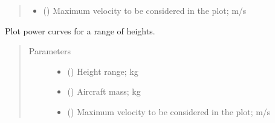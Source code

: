 \documentclass[letterpaper,10pt,english]{sphinxmanual}
\begin{document}
\begin{fulllineitems}
\begin{fulllineitems}
\begin{quote}
\begin{description}
\begin{itemize}
\item {} 
\sphinxAtStartPar
{} (\sphinxstyleliteralemphasis{\sphinxupquote{, }}) \textendash{} Maximum velocity to be considered in the plot; m/s

\end{itemize}

\end{description}\end{quote}

\end{fulllineitems}


\begin{fulllineitems}
\label{\detokenize{modules/helicopter:helicopter.Helicopter.plot_power_sweep_height}}
\sphinxAtStartPar
Plot power curves for a range of heights.
\begin{quote}\begin{description}
\item[{Parameters}] \leavevmode\begin{itemize}
\item {} 
\sphinxAtStartPar
{} (\sphinxstyleliteralemphasis{\sphinxupquote{(}}\sphinxstyleliteralemphasis{\sphinxupquote{, }}\sphinxstyleliteralemphasis{\sphinxupquote{, }}\sphinxstyleliteralemphasis{\sphinxupquote{)}}) \textendash{} Height range; kg

\item {} 
\sphinxAtStartPar
{} () \textendash{} Aircraft mass; kg

\item {} 
\sphinxAtStartPar
{} (\sphinxstyleliteralemphasis{\sphinxupquote{, }}) \textendash{} Maximum velocity to be considered in the plot; m/s


\end{itemize}
\end{description}
\end{quote}
\end{fulllineitems}
\end{fulllineitems}
\end{document}
